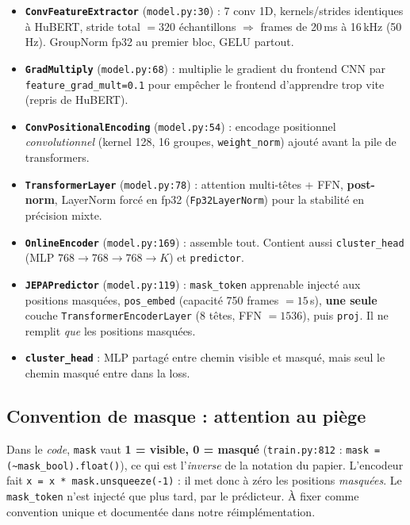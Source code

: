 \documentclass[11pt,a4paper]{article}
\newcommand{\code}[1]{\texttt{#1}}
\newcommand{\file}[1]{\texttt{#1}}
\begin{document}
\begin{itemize}[leftmargin=*]
  \item \textbf{\code{ConvFeatureExtractor}} (\file{model.py:30}) : 7 conv
  1D, kernels/strides identiques à HuBERT, stride total $=320$ échantillons
  $\Rightarrow$ frames de 20\,ms à 16\,kHz (50\,Hz). GroupNorm fp32 au
  premier bloc, GELU partout.

  \item \textbf{\code{GradMultiply}} (\file{model.py:68}) : multiplie le
  gradient du frontend CNN par \code{feature\_grad\_mult=0.1} pour
  empêcher le frontend d'apprendre trop vite (repris de HuBERT).

  \item \textbf{\code{ConvPositionalEncoding}} (\file{model.py:54}) :
  encodage positionnel \emph{convolutionnel} (kernel 128, 16 groupes,
  \code{weight\_norm}) ajouté avant la pile de transformers.

  \item \textbf{\code{TransformerLayer}} (\file{model.py:78}) : attention
  multi-têtes + FFN, \textbf{post-norm}, LayerNorm forcé en fp32
  (\code{Fp32LayerNorm}) pour la stabilité en précision mixte.

  \item \textbf{\code{OnlineEncoder}} (\file{model.py:169}) : assemble tout.
  Contient aussi \code{cluster\_head} (MLP $768\!\to\!768\!\to\!768\!\to\!K$)
  et \code{predictor}.

  \item \textbf{\code{JEPAPredictor}} (\file{model.py:119}) : \code{mask\_token}
  apprenable injecté aux positions masquées, \code{pos\_embed} (capacité 750
  frames $=15$\,s), \textbf{une seule} couche \code{TransformerEncoderLayer}
  (8 têtes, FFN $=1536$), puis \code{proj}. Il ne remplit \emph{que} les
  positions masquées.

  \item \textbf{\code{cluster\_head}} : MLP partagé entre chemin visible et
  masqué, mais seul le chemin masqué entre dans la loss.
\end{itemize}

\subsection{Convention de masque : attention au piège}

\begin{warnbox}
Dans le \emph{code}, \code{mask} vaut \textbf{1 = visible, 0 = masqué}
(\file{train.py:812} : \code{mask = (\textasciitilde mask\_bool).float()}),
ce qui est l'\emph{inverse} de la notation du papier. L'encodeur fait
\code{x = x * mask.unsqueeze(-1)} : il met donc à zéro les positions
\emph{masquées}. Le \code{mask\_token} n'est injecté que plus tard, par le
prédicteur. À fixer comme convention unique et documentée dans notre
réimplémentation.
\end{warnbox}
\end{document}
